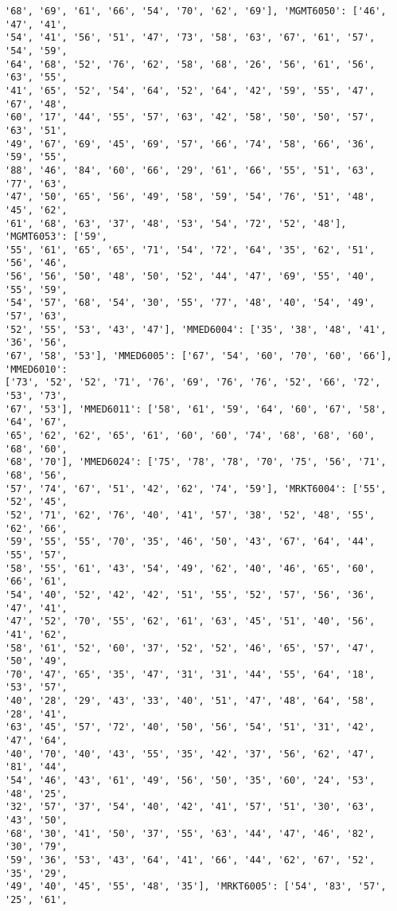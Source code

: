 \documentclass[11pt]{article}
\begin{document}
\begin{Verbatim}[commandchars=\\\{\}]
'68', '69', '61', '66', '54', '70', '62', '69'], 'MGMT6050': ['46', '47', '41',
'54', '41', '56', '51', '47', '73', '58', '63', '67', '61', '57', '54', '59',
'64', '68', '52', '76', '62', '58', '68', '26', '56', '61', '56', '63', '55',
'41', '65', '52', '54', '64', '52', '64', '42', '59', '55', '47', '67', '48',
'60', '17', '44', '55', '57', '63', '42', '58', '50', '50', '57', '63', '51',
'49', '67', '69', '45', '69', '57', '66', '74', '58', '66', '36', '59', '55',
'88', '46', '84', '60', '66', '29', '61', '66', '55', '51', '63', '77', '63',
'47', '50', '65', '56', '49', '58', '59', '54', '76', '51', '48', '45', '62',
'61', '68', '63', '37', '48', '53', '54', '72', '52', '48'], 'MGMT6053': ['59',
'55', '61', '65', '65', '71', '54', '72', '64', '35', '62', '51', '56', '46',
'56', '56', '50', '48', '50', '52', '44', '47', '69', '55', '40', '55', '59',
'54', '57', '68', '54', '30', '55', '77', '48', '40', '54', '49', '57', '63',
'52', '55', '53', '43', '47'], 'MMED6004': ['35', '38', '48', '41', '36', '56',
'67', '58', '53'], 'MMED6005': ['67', '54', '60', '70', '60', '66'], 'MMED6010':
['73', '52', '52', '71', '76', '69', '76', '76', '52', '66', '72', '53', '73',
'67', '53'], 'MMED6011': ['58', '61', '59', '64', '60', '67', '58', '64', '67',
'65', '62', '62', '65', '61', '60', '60', '74', '68', '68', '60', '68', '60',
'68', '70'], 'MMED6024': ['75', '78', '78', '70', '75', '56', '71', '68', '56',
'57', '74', '67', '51', '42', '62', '74', '59'], 'MRKT6004': ['55', '52', '45',
'52', '71', '62', '76', '40', '41', '57', '38', '52', '48', '55', '62', '66',
'59', '55', '55', '70', '35', '46', '50', '43', '67', '64', '44', '55', '57',
'58', '55', '61', '43', '54', '49', '62', '40', '46', '65', '60', '66', '61',
'54', '40', '52', '42', '42', '51', '55', '52', '57', '56', '36', '47', '41',
'47', '52', '70', '55', '62', '61', '63', '45', '51', '40', '56', '41', '62',
'58', '61', '52', '60', '37', '52', '52', '46', '65', '57', '47', '50', '49',
'70', '47', '65', '35', '47', '31', '31', '44', '55', '64', '18', '53', '57',
'40', '28', '29', '43', '33', '40', '51', '47', '48', '64', '58', '28', '41',
'63', '45', '57', '72', '40', '50', '56', '54', '51', '31', '42', '47', '64',
'40', '70', '40', '43', '55', '35', '42', '37', '56', '62', '47', '81', '44',
'54', '46', '43', '61', '49', '56', '50', '35', '60', '24', '53', '48', '25',
'32', '57', '37', '54', '40', '42', '41', '57', '51', '30', '63', '43', '50',
'68', '30', '41', '50', '37', '55', '63', '44', '47', '46', '82', '30', '79',
'59', '36', '53', '43', '64', '41', '66', '44', '62', '67', '52', '35', '29',
'49', '40', '45', '55', '48', '35'], 'MRKT6005': ['54', '83', '57', '25', '61',

\end{Verbatim}
\end{document}
